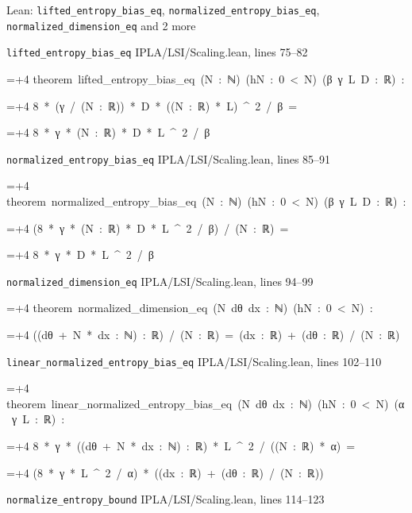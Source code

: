 \documentclass[11pt,a4paper]{article}
\newlength{\leancharwidth}
\newenvironment{leancode}{\par\smallskip\begingroup\ttfamily\footnotesize\raggedright
  \settowidth{\leancharwidth}{M}\setlength{\parskip}{0pt}\setlength{\parindent}{0pt}
  \frenchspacing}{\par\endgroup\smallskip}
\newcommand{\leanline}[2]{\hangindent=\dimexpr#1\leancharwidth+4\leancharwidth\relax
  \hangafter=1\noindent\hspace*{#1\leancharwidth}#2\par}
\newcommand{\leansource}[1]{\par{\footnotesize\color{leanmuted}#1}\par}
\begin{document}
\begin{leanbox}{Lean: \texttt{lifted\_\allowbreak{}entropy\_\allowbreak{}bias\_\allowbreak{}eq}, \texttt{normalized\_\allowbreak{}entropy\_\allowbreak{}bias\_\allowbreak{}eq}, \texttt{normalized\_\allowbreak{}dimension\_\allowbreak{}eq} and 2 more}
\leansource{\texttt{lifted\_\allowbreak{}entropy\_\allowbreak{}bias\_\allowbreak{}eq} \quad IPLA/\allowbreak{}LSI/\allowbreak{}Scaling.lean, lines 75–82}
\begin{leancode}
\leanline{0}{theorem\ lifted\_entropy\_bias\_eq\ (N\ :\ ℕ)\ (hN\ :\ 0\ <\ N)\ (β\ γ\ L\ D\ :\ ℝ)\ :}
\leanline{4}{8\ *\ (γ\ /\ (N\ :\ ℝ))\ *\ D\ *\ ((N\ :\ ℝ)\ *\ L)\ \textasciicircum{}\ 2\ /\ β\ =}
\leanline{6}{8\ *\ γ\ *\ (N\ :\ ℝ)\ *\ D\ *\ L\ \textasciicircum{}\ 2\ /\ β}
\end{leancode}
\leansource{\texttt{normalized\_\allowbreak{}entropy\_\allowbreak{}bias\_\allowbreak{}eq} \quad IPLA/\allowbreak{}LSI/\allowbreak{}Scaling.lean, lines 85–91}
\begin{leancode}
\leanline{0}{theorem\ normalized\_entropy\_bias\_eq\ (N\ :\ ℕ)\ (hN\ :\ 0\ <\ N)\ (β\ γ\ L\ D\ :\ ℝ)\ :}
\leanline{4}{(8\ *\ γ\ *\ (N\ :\ ℝ)\ *\ D\ *\ L\ \textasciicircum{}\ 2\ /\ β)\ /\ (N\ :\ ℝ)\ =}
\leanline{6}{8\ *\ γ\ *\ D\ *\ L\ \textasciicircum{}\ 2\ /\ β}
\end{leancode}
\leansource{\texttt{normalized\_\allowbreak{}dimension\_\allowbreak{}eq} \quad IPLA/\allowbreak{}LSI/\allowbreak{}Scaling.lean, lines 94–99}
\begin{leancode}
\leanline{0}{theorem\ normalized\_dimension\_eq\ (N\ dθ\ dx\ :\ ℕ)\ (hN\ :\ 0\ <\ N)\ :}
\leanline{4}{((dθ\ +\ N\ *\ dx\ :\ ℕ)\ :\ ℝ)\ /\ (N\ :\ ℝ)\ =\ (dx\ :\ ℝ)\ +\ (dθ\ :\ ℝ)\ /\ (N\ :\ ℝ)}
\end{leancode}
\leansource{\texttt{linear\_\allowbreak{}normalized\_\allowbreak{}entropy\_\allowbreak{}bias\_\allowbreak{}eq} \quad IPLA/\allowbreak{}LSI/\allowbreak{}Scaling.lean, lines 102–110}
\begin{leancode}
\leanline{0}{theorem\ linear\_normalized\_entropy\_bias\_eq\ (N\ dθ\ dx\ :\ ℕ)\ (hN\ :\ 0\ <\ N)\ (α\ γ\ L\ :\ ℝ)\ :}
\leanline{4}{8\ *\ γ\ *\ ((dθ\ +\ N\ *\ dx\ :\ ℕ)\ :\ ℝ)\ *\ L\ \textasciicircum{}\ 2\ /\ ((N\ :\ ℝ)\ *\ α)\ =}
\leanline{6}{(8\ *\ γ\ *\ L\ \textasciicircum{}\ 2\ /\ α)\ *\ ((dx\ :\ ℝ)\ +\ (dθ\ :\ ℝ)\ /\ (N\ :\ ℝ))}
\end{leancode}
\leansource{\texttt{normalize\_\allowbreak{}entropy\_\allowbreak{}bound} \quad IPLA/\allowbreak{}LSI/\allowbreak{}Scaling.lean, lines 114–123}
\begin{leancode}

\end{leancode}
\end{leanbox}
\end{document}
